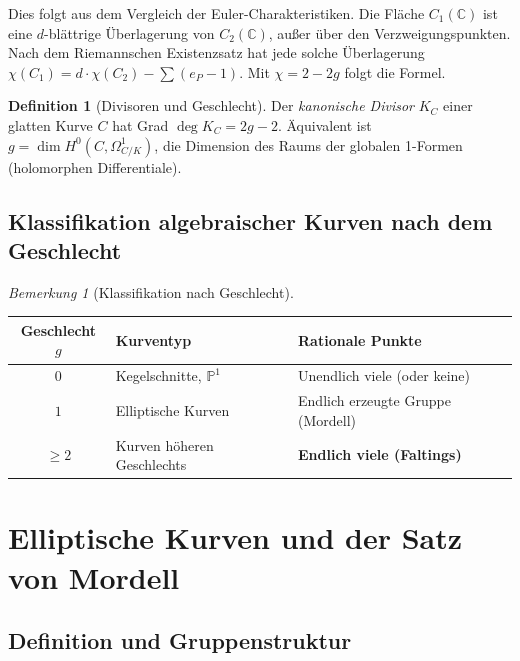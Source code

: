 ﻿\documentclass[12pt,a4paper]{article}
\theoremstyle{plain}
\theoremstyle{definition}
\newtheorem{definition}[theorem]{Definition}
\theoremstyle{remark}
\newtheorem{remark}[theorem]{Bemerkung}
\newenvironment{proof*}[1][Beweis]{%
  \begin{proof}[#1]\renewcommand{\qedsymbol}{$\blacksquare$}}
  {\end{proof}}
\newcommand{\C}{\mathbb{C}}
\begin{document}
\begin{proof*}
Dies folgt aus dem Vergleich der Euler-Charakteristiken. Die Fläche $C_1(\C)$ ist eine
$d$-blättrige Überlagerung von $C_2(\C)$, außer über den Verzweigungspunkten.
Nach dem Riemannschen Existenzsatz hat jede solche Überlagerung
$\chi(C_1) = d \cdot \chi(C_2) - \sum(e_P-1)$.
Mit $\chi = 2-2g$ folgt die Formel.
\end{proof*}

\begin{definition}[Divisoren und Geschlecht]\label{def:div}
Der \emph{kanonische Divisor} $K_C$ einer glatten Kurve $C$ hat Grad $\deg K_C = 2g-2$.
Äquivalent ist $g = \dim H^0(C, \Omega^1_{C/K})$, die Dimension des Raums
der globalen 1-Formen (holomorphen Differentiale).
\end{definition}

\subsection{Klassifikation algebraischer Kurven nach dem Geschlecht}

\begin{remark}[Klassifikation nach Geschlecht]\label{rem:klass_geschlecht}
\begin{center}
\begin{tabular}{cll}
\toprule
Geschlecht $g$ & Kurventyp & Rationale Punkte\\
\midrule
$0$ & Kegelschnitte, $\mathbb{P}^1$ & Unendlich viele (oder keine)\\
$1$ & Elliptische Kurven & Endlich erzeugte Gruppe (Mordell)\\
$\geq 2$ & Kurven höheren Geschlechts & \textbf{Endlich viele (Faltings)}\\
\bottomrule
\end{tabular}
\end{center}
\end{remark}

\section{Elliptische Kurven und der Satz von Mordell}

\subsection{Definition und Gruppenstruktur}
\end{document}
